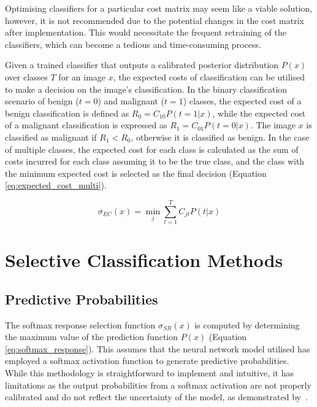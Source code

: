 Optimising classifiers for a particular cost matrix may seem like a viable solution, however, it is not recommended due to the potential changes in the cost matrix after implementation. This would necessitate the frequent retraining of the classifiers, which can become a tedious and time-consuming process.

Given a trained classifier that outputs a calibrated posterior distribution $P(x)$ over classes $T$ for an image $x$, the expected costs of classification can be utilised to make a decision on the image's classification. In the binary classification scenario of benign ($t=0$) and malignant ($t=1$) classes, the expected cost of a benign classification is defined as $R_0 = C_{10} P(t=1|x)$, while the expected cost of a malignant classification is expressed as $R_1 = C_{01} P(t=0|x)$. The image $x$ is classified as malignant if $R_1 < R_0$, otherwise it is classified as benign. In the case of multiple classes, the expected cost for each class is calculated as the sum of costs incurred for each class assuming it to be the true class, and the class with the minimum expected cost is selected as the final decision (Equation \ref{eq:expected_cost_multi}).

\begin{equation}
	\sigma_{EC}(x) = \min_{j} \sum_{t=1}^{T} C_{jt} P(t|x)
	\label{eq:expected_cost_multi}
\end{equation}



\section{Selective Classification Methods}
\label{sec:slective_classification_methods}

\subsection{Predictive Probabilities}
\label{subsec:selective_predictive_probabilites}
The softmax response selection function $\sigma_{SR}(x)$ is computed by determining the maximum value of the prediction function $P(x)$ (Equation \ref{eq:softmax_response}). This assumes that the neural network model utilised has employed a softmax activation function to generate predictive probabilities. While this methodology is straightforward to implement and intuitive, it has limitations as the output probabilities from a softmax activation are not properly calibrated and do not reflect the uncertainty of the model, as demonstrated by~\citep{gal2016dropout}.

